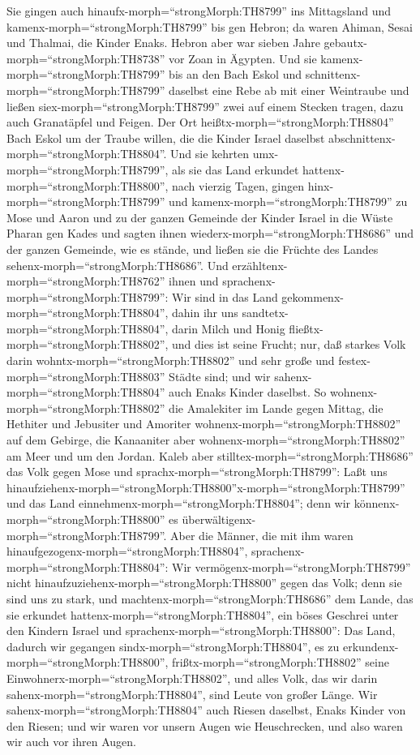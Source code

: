  Sie gingen auch hinaufx-morph=``strongMorph:TH8799'' ins
Mittagsland und kamenx-morph=``strongMorph:TH8799'' bis gen Hebron; da
waren Ahiman, Sesai und Thalmai, die Kinder Enaks. Hebron aber war
sieben Jahre gebautx-morph=``strongMorph:TH8738'' vor Zoan in Ägypten.
 Und sie kamenx-morph=``strongMorph:TH8799'' bis an den
Bach Eskol und schnittenx-morph=``strongMorph:TH8799'' daselbst eine
Rebe ab mit einer Weintraube und ließen
siex-morph=``strongMorph:TH8799'' zwei auf einem Stecken tragen, dazu
auch Granatäpfel und Feigen.  Der Ort
heißtx-morph=``strongMorph:TH8804'' Bach Eskol um der Traube willen, die
die Kinder Israel daselbst abschnittenx-morph=``strongMorph:TH8804''.
 Und sie kehrten umx-morph=``strongMorph:TH8799'', als sie
das Land erkundet hattenx-morph=``strongMorph:TH8800'', nach vierzig
Tagen,  gingen hinx-morph=``strongMorph:TH8799'' und
kamenx-morph=``strongMorph:TH8799'' zu Mose und Aaron und zu der ganzen
Gemeinde der Kinder Israel in die Wüste Pharan gen Kades und sagten
ihnen wiederx-morph=``strongMorph:TH8686'' und der ganzen Gemeinde, wie
es stände, und ließen sie die Früchte des Landes
sehenx-morph=``strongMorph:TH8686''.  Und
erzähltenx-morph=``strongMorph:TH8762'' ihnen und
sprachenx-morph=``strongMorph:TH8799'': Wir sind in das Land
gekommenx-morph=``strongMorph:TH8804'', dahin ihr uns
sandtetx-morph=``strongMorph:TH8804'', darin Milch und Honig
fließtx-morph=``strongMorph:TH8802'', und dies ist seine Frucht;
 nur, daß starkes Volk darin
wohntx-morph=``strongMorph:TH8802'' und sehr große und
festex-morph=``strongMorph:TH8803'' Städte sind; und wir
sahenx-morph=``strongMorph:TH8804'' auch Enaks Kinder daselbst.
 So wohnenx-morph=``strongMorph:TH8802'' die Amalekiter im
Lande gegen Mittag, die Hethiter und Jebusiter und Amoriter
wohnenx-morph=``strongMorph:TH8802'' auf dem Gebirge, die Kanaaniter
aber wohnenx-morph=``strongMorph:TH8802'' am Meer und um den Jordan.
 Kaleb aber stilltex-morph=``strongMorph:TH8686'' das Volk
gegen Mose und sprachx-morph=``strongMorph:TH8799'': Laßt uns
hinaufziehenx-morph=``strongMorph:TH8800''x-morph=``strongMorph:TH8799''
und das Land einnehmenx-morph=``strongMorph:TH8804''; denn wir
könnenx-morph=``strongMorph:TH8800'' es
überwältigenx-morph=``strongMorph:TH8799''.  Aber die
Männer, die mit ihm waren hinaufgezogenx-morph=``strongMorph:TH8804'',
sprachenx-morph=``strongMorph:TH8804'': Wir
vermögenx-morph=``strongMorph:TH8799'' nicht
hinaufzuziehenx-morph=``strongMorph:TH8800'' gegen das Volk; denn sie
sind uns zu stark,  und
machtenx-morph=``strongMorph:TH8686'' dem Lande, das sie erkundet
hattenx-morph=``strongMorph:TH8804'', ein böses Geschrei unter den
Kindern Israel und sprachenx-morph=``strongMorph:TH8800'': Das Land,
dadurch wir gegangen sindx-morph=``strongMorph:TH8804'', es zu
erkundenx-morph=``strongMorph:TH8800'',
frißtx-morph=``strongMorph:TH8802'' seine
Einwohnerx-morph=``strongMorph:TH8802'', und alles Volk, das wir darin
sahenx-morph=``strongMorph:TH8804'', sind Leute von großer Länge.
 Wir sahenx-morph=``strongMorph:TH8804'' auch Riesen
daselbst, Enaks Kinder von den Riesen; und wir waren vor unsern Augen
wie Heuschrecken, und also waren wir auch vor ihren Augen.

